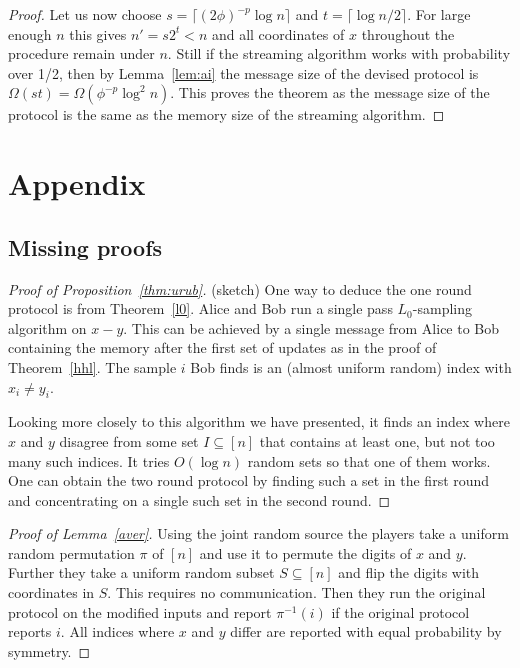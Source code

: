 \documentclass[9pt,letterpaper]{article}
\theoremstyle{remark}
\begin{document}
\begin{proof}
Let us now choose $s=\lceil(2\phi)^{-p}\log n\rceil$ and $t=\lceil\log
n/2\rceil$. For large enough $n$ this gives $n'=s2^t<n$ and all coordinates of
$x$ throughout the procedure remain under $n$. Still if the streaming
algorithm works with probability over 1/2, then  by Lemma~\ref{lem:ai} the message
size of the devised protocol is $\Omega(st)=\Omega(\phi^{-p}\log^2n)$. This
proves the theorem as the message size of the protocol is the same as the
memory size of the streaming algorithm.
\end{proof}




{\small
{}}



%
%
\newpage
\appendix

\section{Appendix}\label{sec:appx}

\subsection{Missing proofs}

\begin{proof}[Proof of Proposition~\ref{thm:urub}] (sketch) One way to deduce the one round protocol is from
  Theorem~\ref{l0}. Alice and Bob run a single pass $L_0$-sampling algorithm
  on $x-y$. This can be achieved by a single message from Alice to Bob
  containing the memory after the first set of updates as in the proof of
  Theorem~\ref{hhl}. The sample $i$ Bob finds is an (almost uniform random)
  index with $x_i\ne y_i$.

Looking more closely to this algorithm we have presented, it finds an index
where $x$ and $y$ disagree from some set $I\subseteq[n]$ that contains at
least one, but not too many such indices. It tries $O(\log n)$ random sets so
that one of them works. One can obtain the two round
protocol by finding such a set in the first round and concentrating on a
single such set in the second round.
\end{proof}

\begin{proof}[Proof of Lemma~\ref{aver}] Using the joint random source the players take a uniform random
  permutation $\pi$ of $[n]$ and use it to permute the digits of $x$ and
  $y$. Further they take a uniform random subset $S\subseteq[n]$ and flip the
  digits with coordinates in $S$. This requires no communication. 
Then they run the original protocol on the modified inputs and report
$\pi^{-1}(i)$ if the original protocol reports $i$. 
All indices where $x$ and $y$ differ are reported with equal probability by
symmetry.
\end{proof}
\end{document}
